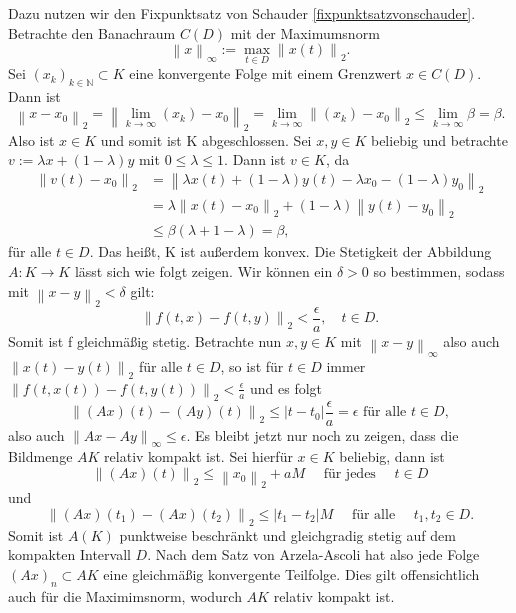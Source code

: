 Dazu nutzen wir den Fixpunktsatz von Schauder \eqref{fixpunktsatzvonschauder}. Betrachte den Banachraum $C(D)$ mit der
Maximumsnorm
\[
    \left\lVert x \right\rVert_{\infty}:=\max_{t \in D} \left\lVert x(t) \right\rVert_2.
\]
Sei $(x_k)_{k \in \mathbb{N}} \subset K$ eine konvergente Folge mit einem Grenzwert $x \in C(D)$. Dann ist
\[
    \left\lVert x - x_0 \right\rVert_2 = \left\lVert \lim_{k \rightarrow \infty}(x_k) - x_0 \right\rVert_2
    = \lim_{k \rightarrow \infty} \left\lVert (x_k) - x_0 \right\rVert_2 \leq \lim_{k \rightarrow \infty} \beta = \beta.
\]
Also ist $x \in K$ und somit ist K abgeschlossen. Sei $x,y \in K $ beliebig und betrachte $v:=\lambda x + (1-\lambda)y$
mit $0 \leq \lambda \leq 1$. Dann ist $v \in K$, da
\begin{align*}
    \left\lVert v(t) - x_0 \right\rVert_2
    &= \left\lVert \lambda x(t) + (1-\lambda)y(t) - \lambda x_0 - (1-\lambda)y_0 \right\rVert_2 \\
    &= \lambda \left\lVert x(t) - x_0 \right\rVert_2 + (1 - \lambda) \left\lVert y(t) - y_0 \right\rVert_2 \\
    &\leq \beta (\lambda + 1 - \lambda) = \beta,
\end{align*}
für alle $t \in D$.
Das heißt, K ist außerdem konvex. Die Stetigkeit der Abbildung $A:K \rightarrow K$ lässt sich wie folgt zeigen.
Wir können ein $\delta > 0$ so bestimmen, sodass mit $\left\lVert x - y \right\rVert_2 < \delta$ gilt:
\[
    \left\lVert f(t,x) - f(t,y) \right\rVert_2 < \frac{\epsilon}{a}, \quad t \in D.
\]
Somit ist f gleichmäßig stetig.
Betrachte nun $x, y \in K$ mit $\left\lVert x - y \right\rVert_{\infty}$ also auch $\left\lVert x(t) - y(t) \right\rVert_2$
für alle $t \in D$, so ist für $t \in D$ immer $\left\lVert f(t,x(t)) - f(t,y(t)) \right\rVert_2 < \frac{\epsilon}{a}$ und
es folgt
\[
    \left\lVert (Ax)(t) - (Ay)(t) \right\rVert_2 \leq |t - t_0| \frac{\epsilon}{a} = \epsilon \text{ für alle } t \in D,
\]
also auch $\left\lVert Ax - Ay \right\rVert_{\infty} \leq \epsilon$. Es bleibt jetzt nur noch zu zeigen, dass die
Bildmenge $AK$ relativ kompakt ist. Sei hierfür $x \in K$ beliebig, dann ist
\[
    \left\lVert (Ax)(t) \right\rVert_2 \leq \left\lVert x_0 \right\rVert_2 + aM \quad \text{ für jedes } \quad t \in D
\] und
\[
    \left\lVert (Ax)(t_1) - (Ax)(t_2) \right\rVert_2 \leq |t_1 - t_2| M \quad \text{ für alle } \quad t_1,t_2 \in D.
\]
Somit ist $A(K)$ punktweise beschränkt und gleichgradig stetig auf dem kompakten Intervall $D$. Nach dem Satz von
Arzela-Ascoli \cite[49]{beckGewohnlicheDifferentialgleichungen2018} hat also jede Folge $(Ax)_n\subset AK$ eine
gleichmäßig konvergente Teilfolge. Dies gilt offensichtlich auch für die Maximimsnorm, wodurch $AK$ relativ kompakt
ist. \qedwhite\\

